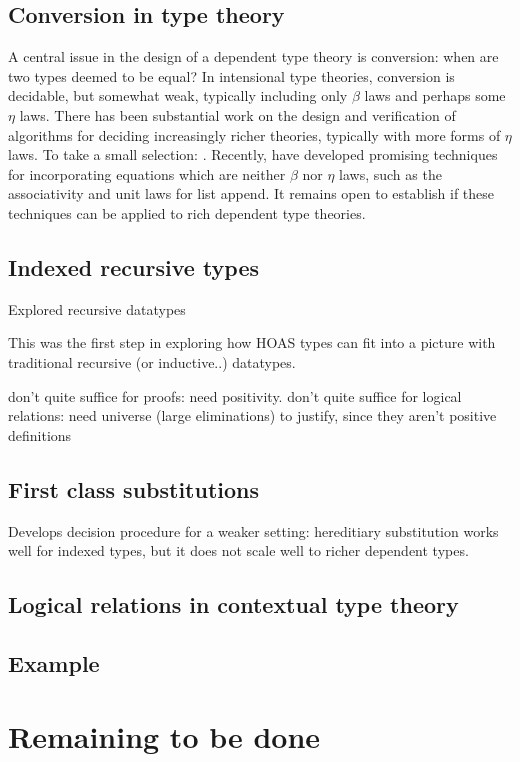 \documentclass{article}
\begin{document}
\subsection{Conversion in type theory}
A central issue in the design of a dependent type theory is
conversion: when are two types deemed to be equal? In
intensional type theories, conversion is decidable, but somewhat
weak, typically including only $\beta$ laws and perhaps some $\eta$
laws. There has been substantial work on the design and verification
of algorithms for deciding increasingly richer theories, typically
with more forms of $\eta$ laws. To take a
small selection: \cite{Coquand91,Harper05,Abel11}. Recently,
\cite{Allais13} have developed promising techniques for incorporating equations
which are neither $\beta$ nor $\eta$ laws, such as the associativity
and unit laws for list append. It remains open to establish if 
these techniques can be applied to rich dependent type theories.

\subsection{Indexed recursive types}
Explored recursive datatypes \citep{Cave12}

This was the first step in exploring how HOAS types can fit
into a picture with traditional recursive (or inductive..) datatypes. 

don't quite suffice for proofs: need positivity. don't quite suffice
for logical relations: need universe (large eliminations) to justify,
since they aren't positive definitions
\subsection{First class substitutions}
Develops decision procedure for a weaker setting: hereditiary
substitution works well for indexed types, but it does not scale well
to richer dependent types. \citep{Cave13}

\subsection{Logical relations in contextual type theory}
\citep{Cave14}
\subsection{Example}
\section{Remaining to be done}
\end{document}
